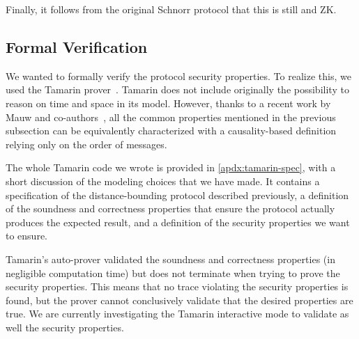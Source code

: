 Finally, it follows from the original Schnorr protocol that this is still  and \ac{ZK}.

\subsection{Formal Verification}

We wanted to formally verify the protocol security properties. To realize this, 
we used the Tamarin prover~\cite{meier2013tamarin}. Tamarin does not include 
originally the possibility to reason on time and space in its model.
However, thanks to a recent work by Mauw and co-authors~\cite{TamarinDB}, all the common properties mentioned in the previous subsection can be equivalently characterized with a causality-based definition relying only on the order of messages.

The whole Tamarin code we wrote is provided in \cref{apdx:tamarin-spec}, with a short discussion of the modeling choices that we have made. 
It contains a specification of the distance-bounding protocol described previously, a definition of the soundness and correctness properties that ensure the protocol actually produces the expected result, and a definition of the security properties we want to ensure.

Tamarin's auto-prover validated the soundness and correctness properties (in negligible computation time) but does not terminate when trying to prove the security properties.
This means that no trace violating the security properties is found, but the prover cannot conclusively validate that the desired properties are true. 
We are currently investigating the Tamarin interactive mode to validate as well the security properties.


